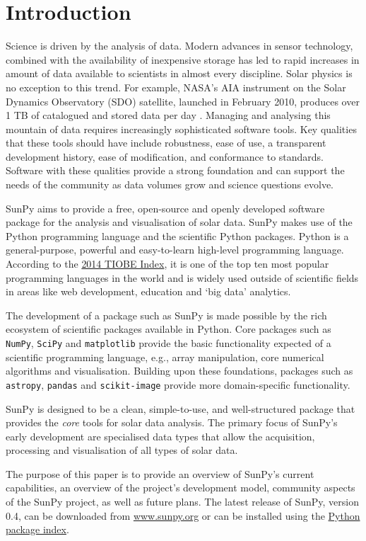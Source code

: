 \section{Introduction}\label{sec:Intro}

Science is driven by the analysis of data. Modern advances in sensor
technology, combined with the availability of inexpensive storage has led to
rapid increases in amount of data available to scientists in almost
every discipline.  Solar physics is no exception to this trend. For example, NASA's
AIA instrument on the Solar Dynamics Observatory (SDO) satellite, launched in February 2010,
produces over 1 TB of catalogued and stored data per day \citep{aia}. Managing and
analysing this mountain of data
requires increasingly sophisticated software tools.  Key qualities
that these tools should have include robustness, ease of use, a
transparent development history, ease of modification, and conformance
to standards.  Software with these qualities provide a strong
foundation and can support the needs of the community as data
volumes grow and science questions evolve.

SunPy aims to provide a free, open-source and openly developed software package 
for the analysis and visualisation of solar data. SunPy makes use of the Python 
programming language and the scientific Python packages. Python is a general-purpose, 
powerful and easy-to-learn high-level programming language.
According to the \href{http://www.tiobe.com/index.php/content/paperinfo/tpci/index.html}{2014 TIOBE Index},
 it is one of the top ten most popular programming languages in the world 
and is widely used outside of scientific fields in areas like web development, education 
and `big data' analytics.


The development of a package such as SunPy is made possible by the 
rich ecosystem of scientific packages available in Python. Core packages such 
as \texttt{NumPy}, \texttt{SciPy} and \texttt{matplotlib} 
provide the basic functionality expected of a scientific programming language,
e.g., array manipulation, core numerical algorithms and visualisation. 
Building upon these foundations, packages such as \texttt{astropy}, \texttt{pandas} and 
\texttt{scikit-image} provide more domain-specific functionality.

SunPy is designed to be a clean, simple-to-use, and well-structured 
package that provides the \textit{core} tools for solar data analysis. 
The primary focus of SunPy's early development are 
specialised data types that allow the acquisition, processing and 
visualisation of all types of solar data.

The purpose of this paper is to provide an overview of SunPy's current 
capabilities, an overview of the project's development model, community aspects of the 
SunPy project, as well as future plans. The latest release of SunPy, version 0.4,
can be downloaded from \href{http://sunpy.org}{www.sunpy.org} or can be
installed using the \href{http://pypi.python.org/pypi}{Python package index}.
